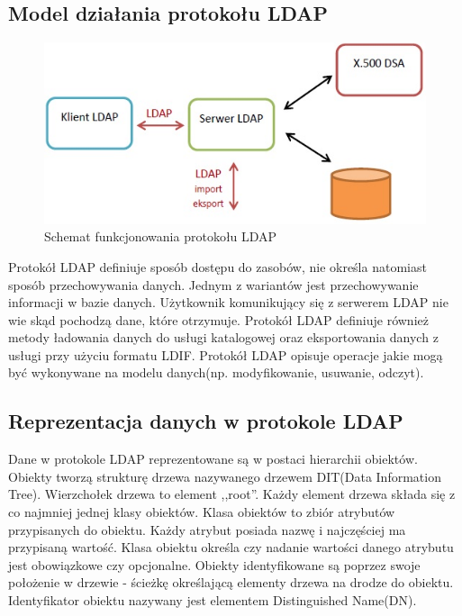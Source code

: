 	\subsection{Model działania protokołu LDAP}

		\begin{figure}[h]
			\centering
			\includegraphics{img/ldap.jpg}
			\caption{Schemat funkcjonowania protokołu  LDAP}
			\label{Schemat funkcjonowania protokolu  LDAP}
		\end{figure}

		Protokół LDAP definiuje sposób dostępu do zasobów, nie określa natomiast sposób przechowywania danych. Jednym z wariantów jest przechowywanie informacji w bazie danych. Użytkownik komunikujący się z serwerem LDAP nie wie skąd pochodzą dane, które otrzymuje. Protokół LDAP definiuje również metody ładowania danych do usługi katalogowej oraz eksportowania danych z usługi przy użyciu formatu LDIF. Protokół LDAP opisuje operacje jakie mogą być wykonywane na modelu danych(np. modyfikowanie, usuwanie, odczyt).

	\subsection{Reprezentacja danych w protokole LDAP}

		Dane w protokole LDAP reprezentowane są w postaci hierarchii obiektów\cite{ZyTrax13}. Obiekty tworzą strukturę drzewa nazywanego drzewem DIT(Data Information Tree). Wierzchołek drzewa to element ,,root''. Każdy element drzewa składa się z co najmniej jednej klasy obiektów. Klasa obiektów to zbiór atrybutów przypisanych do obiektu. Każdy atrybut posiada nazwę i najczęściej ma przypisaną wartość. Klasa obiektu określa czy nadanie wartości danego atrybutu jest obowiązkowe czy opcjonalne. Obiekty identyfikowane są poprzez swoje położenie w drzewie - ścieżkę określającą elementy drzewa na drodze do obiektu. Identyfikator obiektu nazywany jest elementem Distinguished Name(DN).

